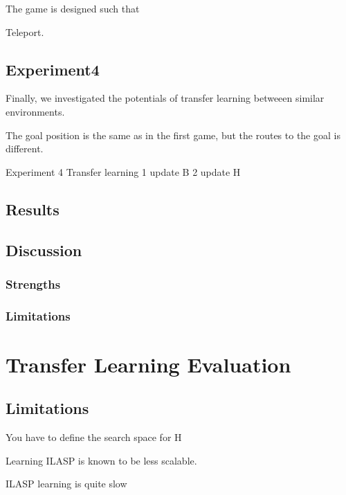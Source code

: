 The game is designed such that 

Teleport. 

\subsection{Experiment4}
Finally, we investigated the potentials of transfer learning betweeen similar environments. 

The goal position is the same as in the first game, but the routes to the goal is different. 

Experiment 4 Transfer learning 
    1 update B
    2 update H

\subsection{Results}

\subsection{Discussion}
\subsubsection{Strengths}

\subsubsection{Limitations}

\section{Transfer Learning Evaluation}
\label{transfer_learning}

\subsection{Limitations}

You have to define the search space for H

Learning ILASP is known to be less scalable. 

ILASP learning is quite slow